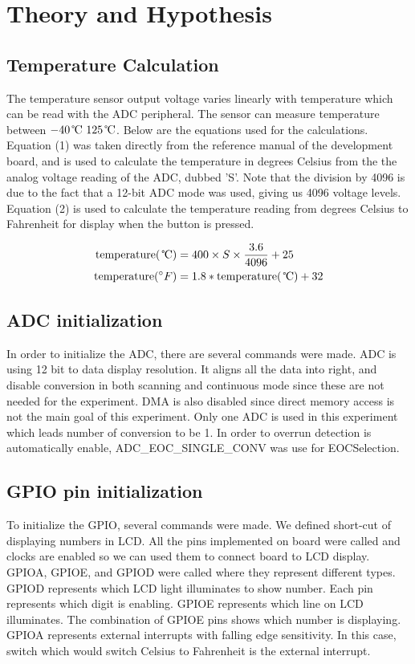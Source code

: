 \documentclass{article}
\begin{document}
\section{Theory and Hypothesis}

\subsection{Temperature Calculation}
The temperature sensor output voltage varies linearly with temperature which can be read with the ADC peripheral. The sensor can measure temperature between \(-40\, \celsius ~ 125\, \celsius \). Below are the equations used for the calculations. Equation (1) was taken directly from the reference manual of the development board\cite{stm32ref}, and is used to calculate the temperature in degrees Celsius from the the analog voltage reading of the ADC, dubbed 'S'. Note that the division by 4096 is due to the fact that a 12-bit ADC mode was used, giving us 4096 voltage levels. Equation (2) is used to calculate the temperature reading from degrees Celsius to Fahrenheit for display when the button is pressed. 

\begin{align}
\text{temperature}(\, \celsius) &= 400\times S \times\frac{3.6}{4096} + 25 \\
\text{temperature}(^{\circ}F) &= 1.8*\text{temperature}(\, \celsius) + 32
\end{align}
\subsection{ADC initialization}
In order to initialize the ADC, there are several commands were made. ADC is using 12 bit to data display resolution. It aligns all the data into right, and disable conversion in both scanning and continuous mode since these are not needed for the experiment. DMA is also disabled since direct memory access is not the main goal of this experiment. Only one ADC is used in this experiment which leads number of conversion to be 1. In order to overrun detection is automatically enable, ADC\_EOC\_SINGLE\_CONV was use for EOCSelection.  
\subsection{GPIO pin initialization}
To initialize the GPIO, several commands were made. We defined short-cut of displaying numbers in LCD. All the pins implemented on board were called and clocks are enabled so we can used them to connect board to LCD display. GPIOA, GPIOE, and GPIOD were called where they represent different types. GPIOD represents which LCD light illuminates to show number. Each pin represents which digit is enabling. GPIOE represents which line on LCD illuminates. The combination of GPIOE pins shows which number is displaying. GPIOA represents external interrupts with falling edge sensitivity. In this case, switch which would switch Celsius to Fahrenheit is the external interrupt.
\end{document}

